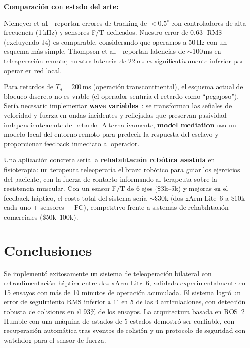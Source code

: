 \documentclass[journal,10pt,twoside]{IEEEtran}
\begin{document}
\textbf{Comparación con estado del arte:}

Niemeyer et al.~\cite{niemeyer2008} reportan errores de tracking de
$<0{.}5^\circ$ con controladores de alta frecuencia (1\,kHz) y sensores
F/T dedicados. Nuestro error de 0.63$^\circ$ RMS (excluyendo J4)
es comparable, considerando que operamos a 50\,Hz con un esquema más
simple. Thompson et al.~\cite{thompson2001} reportan latencias de
$\sim$100\,ms en teleoperación remota; nuestra latencia de 22\,ms es
significativamente inferior por operar en red local.

Para retardos de $T_d=200$\,ms (operación
transcontinental), el esquema actual de bloqueo discreto no es viable
(el operador sentiría el retardo como ``pegajoso''). Sería necesario
implementar \textbf{wave variables}~\cite{niemeyer2008}: se
transforman las señales de velocidad y fuerza en ondas incidentes y
reflejadas que preservan pasividad independientemente del retardo.
Alternativamente, \textbf{model mediation} usa un modelo local del
entorno remoto para predecir la respuesta del esclavo y proporcionar
feedback inmediato al operador.

Una aplicación concreta sería la \textbf{rehabilitación
robótica asistida} en fisioterapia: un terapeuta teleoperaría el brazo
robótico para guiar los ejercicios del paciente, con la fuerza de
contacto informando al terapeuta sobre la resistencia muscular.
Con un sensor F/T de 6 ejes (\$3k--5k) y mejoras en el feedback
háptico, el costo total del sistema sería $\sim$\$30k (dos xArm
Lite~6 a \$10k cada uno + sensores + PC), competitivo frente a
sistemas de rehabilitación comerciales (\$50k--100k).

\section{Conclusiones}
\label{sec:conclusions}

Se implementó exitosamente un sistema de teleoperación bilateral con
retroalimentación háptica entre dos xArm Lite~6, validado
experimentalmente en 15 ensayos con más de 10 minutos de operación
acumulada. El sistema logró un error de seguimiento RMS inferior a
1$^\circ$ en 5 de las 6 articulaciones, con detección robusta de
colisiones en el 93\% de los ensayos. La arquitectura basada en ROS~2
Humble con una máquina de estados de 5 estados demostró ser confiable,
con recuperación automática tras eventos de colisión y un protocolo
de seguridad con watchdog para el sensor de fuerza.
\end{document}
